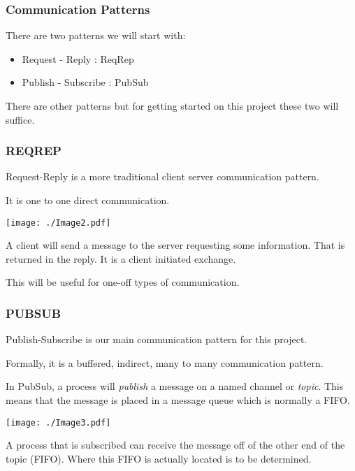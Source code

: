 \documentclass[xcolor=svgnames]{beamer}
\begin{document}

\begin{frame}[fragile]
\frametitle{Communication Patterns}

There are two patterns we will start with:
\begin{itemize}
\item Request - Reply : ReqRep
\item Publish - Subscribe :  PubSub
\end{itemize}\vfill

There are other patterns but for getting started on this project
these two will suffice.

\end{frame}



\begin{frame}[fragile]
\frametitle{REQREP}


Request-Reply is a more traditional client server communication 
pattern. \vfill 

It is  one to one direct communication.
\vfill 
\begin{center}
\texttt{[image: ./Image2.pdf]}
\end{center}
\vfill
 A client will send a message to the server requesting 
some information.  That is returned in the reply.   It is a client
initiated exchange.\vfill

This will be useful for one-off types of communication.

\end{frame}



\begin{frame}[fragile]
\frametitle{PUBSUB}

Publish-Subscribe is our main communication pattern for this project.\vfill

Formally, it is a buffered, indirect, many to many communication pattern.\vfill

In PubSub, a process will {\it publish} a message on a named channel or \textit{topic}. This means that the 
message is placed in a message queue which is normally a FIFO. \vfill

\vfill 
\begin{center}
\texttt{[image: ./Image3.pdf]}
\end{center}
\vfill
A process that is subscribed
can receive the message off of the other end of the topic (FIFO).  Where this FIFO
is actually located is to be determined.
\end{frame}
\end{document}
